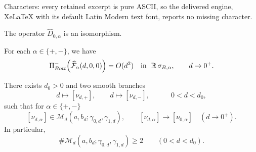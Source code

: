 \documentclass[10pt,a4paper]{amsart}
\newcommand{\R}{\mathbb{R}}
\begin{document}
Characters: every retained excerpt is pure ASCII, so the delivered engine, XeLaTeX with its default Latin Modern text font, reports no missing character.
\begin{lem}
\label{lem:upper-augmented-isomorphism}
The operator $\widehat D_{0,\alpha}$ is an isomorphism.
\end{lem}

\begin{lem}\label{lem:quadratic-upper-bott}
For each $\alpha\in\{+,-\}$, we have
\[
\Pi_{\rm Bott}^-\Bigl(\widehat{\mathcal F}_{\alpha}(d,0,0)\Bigr)=O(d^2)
\quad\text{in }~ \R\,\sigma_{B,\alpha},
\qquad d\to0^+.
\]   
\end{lem}

\begin{prop}\label{prop:at-least-two-small-d}
There exists $d_0>0$ and two smooth branches
\[
d\longmapsto [\nu_{d,+}],
\qquad d\longmapsto [\nu_{d,-}],
\qquad \quad 0<d<d_0,
\]
such that for $\alpha\in \{+,-\}$
\[
[\nu_{d,\alpha}]\in \mathcal{M}_d(a,b_d;\gamma_{0,d},\gamma_{1,d}),
\qquad
[\nu_{d,\alpha}]\to [\nu_{0,\alpha}]
\quad (d\to 0^+).
\]
In particular,
\[
\#\mathcal{M}_d(a,b_d;\gamma_{0,d},\gamma_{1,d})\ge 2\qquad (0<d<d_0).
\]
\end{prop}
\end{document}
